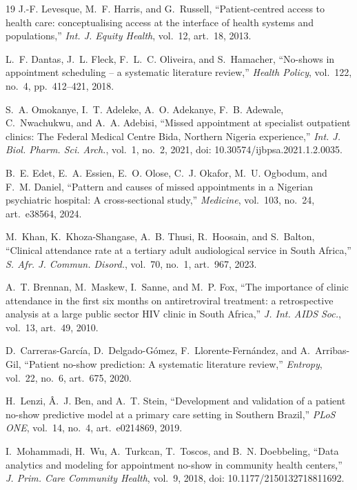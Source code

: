 \documentclass[conference]{IEEEtran}
\begin{document}
\begin{thebibliography}{19}
J.-F. Levesque, M.~F. Harris, and G.~Russell, ``Patient-centred access to health care: conceptualising access at the interface of health systems and populations,'' \emph{Int. J. Equity Health}, vol.~12, art.~18, 2013.

L.~F. Dantas, J.~L. Fleck, F.~L.~C. Oliveira, and S.~Hamacher, ``No-shows in appointment scheduling -- a systematic literature review,'' \emph{Health Policy}, vol.~122, no.~4, pp.~412--421, 2018.

S.~A. Omokanye, I.~T. Adeleke, A.~O. Adekanye, F.~B. Adewale, C.~Nwachukwu, and A.~A. Adebisi, ``Missed appointment at specialist outpatient clinics: The Federal Medical Centre Bida, Northern Nigeria experience,'' \emph{Int. J. Biol. Pharm. Sci. Arch.}, vol.~1, no.~2, 2021, doi: 10.30574/ijbpsa.2021.1.2.0035.

B.~E. Edet, E.~A. Essien, E.~O. Olose, C.~J. Okafor, M.~U. Ogbodum, and F.~M. Daniel, ``Pattern and causes of missed appointments in a Nigerian psychiatric hospital: A cross-sectional study,'' \emph{Medicine}, vol.~103, no.~24, art.~e38564, 2024.

M.~Khan, K.~Khoza-Shangase, A.~B. Thusi, R.~Hoosain, and S.~Balton, ``Clinical attendance rate at a tertiary adult audiological service in South Africa,'' \emph{S. Afr. J. Commun. Disord.}, vol.~70, no.~1, art.~967, 2023.

A.~T. Brennan, M.~Maskew, I.~Sanne, and M.~P. Fox, ``The importance of clinic attendance in the first six months on antiretroviral treatment: a retrospective analysis at a large public sector HIV clinic in South Africa,'' \emph{J. Int. AIDS Soc.}, vol.~13, art.~49, 2010.

D.~Carreras-Garc\'{i}a, D.~Delgado-G\'{o}mez, F.~Llorente-Fern\'{a}ndez, and A.~Arribas-Gil, ``Patient no-show prediction: A systematic literature review,'' \emph{Entropy}, vol.~22, no.~6, art.~675, 2020.

H.~Lenzi, \^{A}.~J. Ben, and A.~T. Stein, ``Development and validation of a patient no-show predictive model at a primary care setting in Southern Brazil,'' \emph{PLoS ONE}, vol.~14, no.~4, art.~e0214869, 2019.

I.~Mohammadi, H.~Wu, A.~Turkcan, T.~Toscos, and B.~N. Doebbeling, ``Data analytics and modeling for appointment no-show in community health centers,'' \emph{J. Prim. Care Community Health}, vol.~9, 2018, doi: 10.1177/2150132718811692.


\end{thebibliography}
\end{document}
